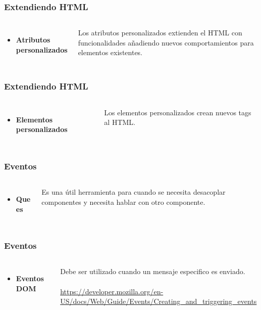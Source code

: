 \documentclass{beamer}
\begin{document}
\begin{frame}
\frametitle{Extendiendo HTML}
\begin{columns}[c]
\begin{itemize}
\item \textbf{Atributos personalizados}
\end{itemize}
Los atributos personalizados extienden el HTML con funcionalidades a\~nadiendo nuevos comportamientos para elementos
existentes.
\end{columns}
\end{frame}
\begin{frame}
\frametitle{Extendiendo HTML}
\begin{columns}[c]
\begin{itemize}
\item \textbf{Elementos personalizados}
\end{itemize}
Los elementos personalizados crean nuevos tags al HTML.
\end{columns}
\end{frame}
\begin{frame}
\frametitle{Eventos}
\begin{columns}[c]
\begin{itemize}
\item \textbf{Que es}
\end{itemize}
Es una \'util herramienta  para cuando se necesita desacoplar componentes y necesita hablar con otro componente.
\end{columns}
\end{frame}
\begin{frame}
\frametitle{Eventos}
\begin{columns}[c]
\begin{itemize}
\item \textbf{Eventos DOM}
\end{itemize}
Debe ser utilizado cuando un mensaje especifico es enviado.
\\~\\
{\color{blue}\url{https://developer.mozilla.org/en-US/docs/Web/Guide/Events/Creating_and_triggering_events}}
\end{columns}
\end{frame}
\end{document}
